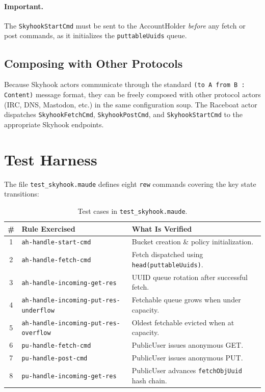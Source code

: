 \documentclass[11pt]{article}
\begin{document}
\paragraph{Important.}  The \texttt{SkyhookStartCmd} must be sent to the
AccountHolder \emph{before} any fetch or post commands, as it
initializes the \texttt{puttableUuids} queue.

\subsection{Composing with Other Protocols}

Because Skyhook actors communicate through the standard
\texttt{(to~A from~B : Content)} message format, they can be freely
composed with other protocol actors (IRC, DNS, Mastodon, etc.) in the
same configuration soup.  The Raceboat actor dispatches
\texttt{SkyhookFetchCmd}, \texttt{SkyhookPostCmd}, and
\texttt{SkyhookStartCmd} to the appropriate Skyhook endpoints.

\section{Test Harness}\label{sec:tests}

The file \texttt{test\_skyhook.maude} defines eight \texttt{rew}
commands covering the key state transitions:

\begin{table}[H]
\centering
\small
\begin{tabular}{@{}clp{7cm}@{}}
\toprule
\textbf{\#} & \textbf{Rule Exercised} & \textbf{What Is Verified} \\
\midrule
1 & \texttt{ah-handle-start-cmd}                & Bucket creation \& policy initialization. \\
2 & \texttt{ah-handle-fetch-cmd}                & Fetch dispatched using \texttt{head(puttableUuids)}. \\
3 & \texttt{ah-handle-incoming-get-res}          & UUID queue rotation after successful fetch. \\
4 & \texttt{ah-handle-incoming-put-res-underflow}& Fetchable queue grows when under capacity. \\
5 & \texttt{ah-handle-incoming-put-res-overflow} & Oldest fetchable evicted when at capacity. \\
6 & \texttt{pu-handle-fetch-cmd}                & PublicUser issues anonymous GET. \\
7 & \texttt{pu-handle-post-cmd}                 & PublicUser issues anonymous PUT. \\
8 & \texttt{pu-handle-incoming-get-res}          & PublicUser advances \texttt{fetchObjUuid} hash chain. \\
\bottomrule
\end{tabular}
\caption{Test cases in \texttt{test\_skyhook.maude}.}
\end{table}
\end{document}
